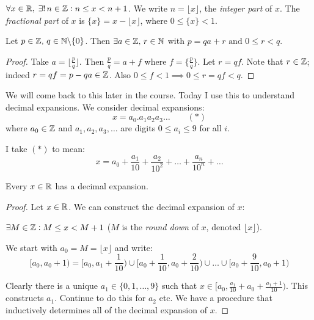\documentclass[twoside]{scrartcl}
\begin{document}
\begin{theorem} 
$\forall x \in\mathbb{R}, \;\exists!\,n \in\mathbb{Z} : n \leq x < n+1$. We write $n = \lfloor x \rfloor$, the \emph{integer part} of $x$. The \emph{fractional part} of $x$ is $\{x\} = x - \lfloor x\rfloor$, where $0 \leq \{x\} < 1$. 	
\end{theorem}\vspace*{5pt}

\begin{corollary}
	Let $p \in\mathbb{Z},\, q \in\mathbb{N}\backslash\{0\}$. Then $\exists a \in\mathbb{Z},\, r \in\mathbb{N}$ with 
	$p = qa + r \text{ and } 0 \leq r < q$. 
\end{corollary}
\begin{proof}
Take $a = \lfloor \frac{p}{q}\rfloor$. Then $\frac{p}{q} = a + f$ where $f = \{\frac{p}{q}\}$. Let $r = qf$. Note that $r \in\mathbb{Z}$; indeed $r = qf = p-qa \in\mathbb{Z}$. Also $0 \leq f < 1 \implies 0 \leq r = qf < q.$ 	
\end{proof}

We will come back to this later in the course. Today I use this to understand decimal expansions. We consider decimal expansions: 
\[x = a_0 . a_1a_2a_3 \dots \qquad (*)\]
where $a_0 \in\mathbb{Z}$ and $a_1,a_2,a_3,\dots$ are digits $0 \leq a_i \leq 9$ for all $i$. 

I take $(*)$ to mean: 
\[x = a_0 + \frac{a_1}{10} + \frac{a_2}{10^2} + \dots + \frac{a_n}{10^n}+ \dots\]

\begin{theorem}
Every $x\in\mathbb{R}$ has a decimal expansion. 	
\end{theorem}

\begin{proof}
Let $x\in\mathbb{R}$. We can construct the decimal expansion of $x$: 

$\exists M \in\mathbb{Z} : M \leq x < M+1$ ($M$ is the \emph{round down} of $x$, denoted $\lfloor x \rfloor$). 

We start with $a_0 = M = \lfloor x \rfloor$ and write: 
\[[a_0, a_0+1) = [a_0,a_1 + \frac{1}{10}) \cup [a_0 + \frac{1}{10}, a_0+\frac{2}{10})\cup \dots\cup [a_0 + \frac{9}{10},a_0 + 1)\]	

Clearly there is a unique $a_1 \in \{0,1,\dots,9\}$ such that $x \in [a_0, \frac{a_1}{10} + a_0 + \frac{a_1 + 1}{10})$. This constructs $a_1$. Continue to do this for $a_2$ etc. We have a procedure that inductively determines all of the decimal expansion of $x$. 
\end{proof}\vspace*{5pt}
\end{document}

